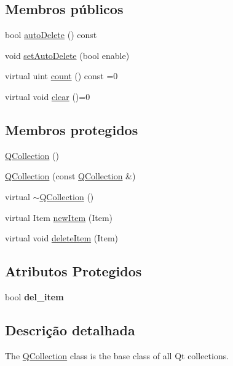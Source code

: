 \subsection*{Membros públicos}
\begin{DoxyCompactItemize}
\item 
bool \hyperlink{class_q_collection_a64c0f7f7f99c10922f570668b10acb2f}{auto\-Delete} () const 
\item 
void \hyperlink{class_q_collection_a52460a3734e18d6137e869acc2590c88}{set\-Auto\-Delete} (bool enable)
\item 
virtual uint \hyperlink{class_q_collection_aaf61167af3fa10ef1ba47c37568f8f96}{count} () const =0
\item 
virtual void \hyperlink{class_q_collection_a893fbba23236417d1abe182ed3aee1a8}{clear} ()=0
\end{DoxyCompactItemize}
\subsection*{Membros protegidos}
\begin{DoxyCompactItemize}
\item 
\hyperlink{class_q_collection_adf77d3cc02325643355ad079d694d8df}{Q\-Collection} ()
\item 
\hyperlink{class_q_collection_a27c8d7b3005c89d8935f27870df2a378}{Q\-Collection} (const \hyperlink{class_q_collection}{Q\-Collection} \&)
\item 
virtual \hyperlink{class_q_collection_aeee410bf0634fae9cdf5c92e10e28fe1}{$\sim$\-Q\-Collection} ()
\item 
virtual Item \hyperlink{class_q_collection_a169f61c366d4b162af27e7255032769c}{new\-Item} (Item)
\item 
virtual void \hyperlink{class_q_collection_aa9c035d812e5a4a00e3b825db9d02d24}{delete\-Item} (Item)
\end{DoxyCompactItemize}
\subsection*{Atributos Protegidos}
\begin{DoxyCompactItemize}
\item 
\hypertarget{class_q_collection_aff7c63decbd32d85aaa83539a9e433e5}{bool {\bfseries del\-\_\-item}}\label{class_q_collection_aff7c63decbd32d85aaa83539a9e433e5}

\end{DoxyCompactItemize}


\subsection{Descrição detalhada}
The \hyperlink{class_q_collection}{Q\-Collection} class is the base class of all Qt collections. 

